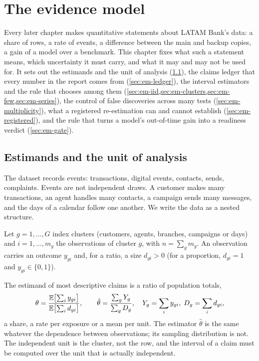 \chapter{The evidence model}\label{ch:evidence-model}

Every later chapter makes quantitative statements about LATAM Bank's data: a share of rows, a rate of events, a
difference between the main and backup copies, a gain of a model over a benchmark. This chapter fixes what such a
statement means, which uncertainty it must carry, and what it may and may not be used for. It sets out the estimands
and the unit of analysis (\cref{sec:em-estimands}), the claims ledger that every number in the report comes from
(\cref{sec:em-ledger}), the interval estimators and the rule that chooses among them
(\cref{sec:em-iid,sec:em-clusters,sec:em-few,sec:em-series}), the control of false discoveries across many tests
(\cref{sec:em-multiplicity}), what a registered re-estimation can and cannot establish
(\cref{sec:em-registered}), and the rule that turns a model's out-of-time gain into a readiness verdict
(\cref{sec:em-gate}).

\section{Estimands and the unit of analysis}\label{sec:em-estimands}

The dataset records events: transactions, digital events, contacts, sends, complaints. Events are not independent
draws. A customer makes many transactions, an agent handles many contacts, a campaign sends many messages, and the
days of a calendar follow one another. We write the data as a nested structure.

\begin{definition}\label{def:clusters}
Let $g = 1, \dots, G$ index clusters (customers, agents, branches, campaigns or days) and $i = 1, \dots, m_g$ the
observations of cluster $g$, with $n = \sum_g m_g$. An observation carries an outcome $y_{gi}$ and, for a ratio, a
size $d_{gi} > 0$ (for a proportion, $d_{gi} = 1$ and $y_{gi} \in \{0, 1\}$).
\end{definition}

The estimand of most descriptive claims is a ratio of population totals,
\begin{equation}\label{eq:ratio}
  \theta = \frac{\mathbb{E} \bigl[\sum_i y_{gi}\bigr]}{\mathbb{E} \bigl[\sum_i d_{gi}\bigr]},
  \qquad
  \hat\theta = \frac{\sum_{g} Y_g}{\sum_{g} D_g},
  \quad Y_g = \sum_{i} y_{gi},\; D_g = \sum_{i} d_{gi},
\end{equation}
a share, a rate per exposure or a mean per unit. The estimator $\hat\theta$ is the same whatever the dependence
between observations; its sampling distribution is not. The independent unit is the cluster, not the row, and the
interval of a claim must be computed over the unit that is actually independent.

